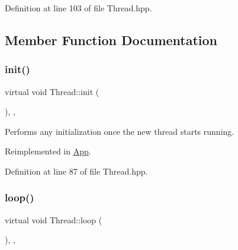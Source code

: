 Definition at line 103 of file Thread.\+hpp.


\begin{DoxyCode}{0}

\end{DoxyCode}


\subsection{Member Function Documentation}
\mbox{\label{classThread_a47884e3db0706dede4379b68e6d845b6}} 
\subsubsection{\texorpdfstring{init()}{init()}}
{\footnotesize\ttfamily virtual void Thread\+::init (\begin{DoxyParamCaption}{ }\end{DoxyParamCaption})\hspace{0.3cm}{\ttfamily [inline]}, {\ttfamily [protected]}, {\ttfamily [virtual]}}

Performs any initialization once the new thread starts running. 

Reimplemented in \mbox{\hyperlink{classApp_a72d6ce9cfb7966c9e61de5e2ecae16ce}{App}}.



Definition at line 87 of file Thread.\+hpp.


\begin{DoxyCode}{0}

\end{DoxyCode}
\mbox{\label{classThread_ab1a2613851db5be41e35aaf3d7dd6ab1}} 
\subsubsection{\texorpdfstring{loop()}{loop()}}
{\footnotesize\ttfamily virtual void Thread\+::loop (\begin{DoxyParamCaption}{ }\end{DoxyParamCaption})\hspace{0.3cm}{\ttfamily [inline]}, {\ttfamily [protected]}, {\ttfamily [virtual]}}


